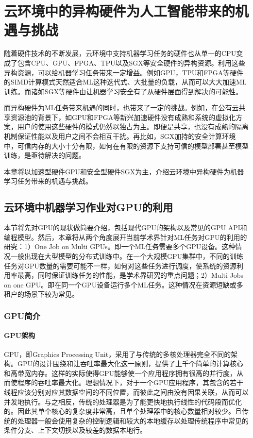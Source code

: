
\chapter{云环境中的异构硬件为人工智能带来的机遇与挑战}
随着硬件技术的不断发展，云环境中支持机器学习任务的硬件也从单一的CPU变成了包含CPU、GPU、FPGA\parencite{putnam2016a}、TPU\parencite{cass2019taking}以及SGX\parencite{costan2016intel}等安全硬件的异构资源。利用这些异构资源，可以给机器学习任务带来一定增益。例如GPU，TPU和FPGA等硬件的SIMD计算模式天然适合ML这种迭代式、大批量的负载，从而可以大大加速ML训练。而诸如SGX等硬件由让机器学习安全有了从硬件层面得到解决的可能性。

而异构硬件为ML任务带来机遇的同时，也带来了一定的挑战。例如，在公有云共享资源池的背景下，如GPU和FPGA等新兴加速硬件没有成熟和系统的虚拟化方案，用户的使用这些硬件的模式仍然以独占为主。即便是共享，也没有成熟的隔离机制保证性能以及用户之间不会相互干扰。再比如，SGX加持的安全计算环境中，可信内存的大小十分有限，如何在有限的资源下支持可信的模型部署甚至模型训练，是亟待解决的问题。

本章将以加速型硬件GPU和安全型硬件SGX为主，介绍云环境中异构硬件为机器学习任务带来的机遇与挑战。

\section{云环境中机器学习作业对GPU的利用}

本节将先对GPU的现状做简要介绍，包括现代GPU的架构以及常见的GPU API和编程模型。然后，本章将从两个角度展开当前学术界针对ML任务对GPU的利用的研究：1）One Job on Multi GPUs。即一个ML任务需要多个GPU设备。这种情况一般出现在大型模型的分布式训练中。在一个大规模GPU集群中，不同的训练任务对GPU数量的需要可能不一样，如何对这些任务进行调度，使系统的资源利用率最高，同时保证训练任务的性能，是学术界研究的重点问题；2）Multi Jobs on one GPU。即在同一个GPU设备运行多个ML任务。这种情况在资源短缺或多租户的场景下较为常见。

\subsection{GPU简介}

\subsubsection{GPU架构}
GPU，即Graphics Processing Unit，采用了与传统的多核处理器完全不同的架构\parencite{hong2017gpu}。GPU的设计围绕和让吞吐率最大化这一原则，提供了上千个简单的计算核心和高带宽内存。这样的实际使得GPU能够使一个应用程序拥有很高的并行度，从而使程序的吞吐率最大化。理想情况下，对于一个GPU应用程序，其包含的若干线程应该分别对应其数据空间的不同位置，而彼此之间由没有因果关联，从而可以并发地执行。与之相反，传统的处理器是为了能更快地执行线性的代码段而优化的。因此其单个核心的复杂度非常高，且单个处理器中的核心数量相对较少。且传统的处理器一般会使用复杂的控制逻辑和较大的本地缓存以处理传统程序中常见的条件分支、上下文切换以及较差的数据本地行。

